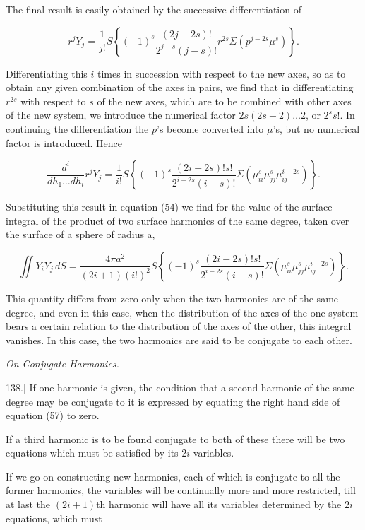 \documentclass[11pt,a4paper]{article}
\begin{document}
The final result is easily obtained by the successive differentiation of

\[
r^jY_j=\frac{1}{j!}S\left\{(-1)^s\frac{(2j-2s)!}{2^{j-s}(j-s)!}r^{2s}\Sigma(p^{j-2s}\mu^s)\right\}.
\]

Differentiating this $i$ times in succession with respect to the new axes, so as to obtain any given combination of the axes in pairs, we find that in differentiating $r^{2s}$ with respect to $s$ of the new axes, which are to be combined with other axes of the new system, we introduce the numerical factor $2s(2s-2)\ldots2$, or $2^s s!$. In continuing the differentiation the $p$'s become converted into $\mu$'s, but no numerical factor is introduced. Hence

\begin{equation}\tag{56}
\frac{d^i}{dh_1\ldots dh_i}r^jY_j
=\frac{1}{i!}S\left\{(-1)^s\frac{(2i-2s)!s!}{2^{i-2s}(i-s)!}
\Sigma(\mu_{ii}^s\mu_{jj}^s\mu_{ij}^{i-2s})\right\}.
\end{equation}

Substituting this result in equation (54) we find for the value of the surface-integral of the product of two surface harmonics of the same degree, taken over the surface of a sphere of radius a,

\begin{equation}\tag{57}
\iint Y_iY_j\,dS=\frac{4\pi a^2}{(2i+1)(i!)^2}
S\left\{(-1)^s\frac{(2i-2s)!s!}{2^{i-2s}(i-s)!}
\Sigma(\mu_{ii}^s\mu_{jj}^s\mu_{ij}^{i-2s})\right\}.
\end{equation}

This quantity differs from zero only when the two harmonics are of the same degree, and even in this case, when the distribution of the axes of the one system bears a certain relation to the distribution of the axes of the other, this integral vanishes. In this case, the two harmonics are said to be conjugate to each other.

{\centering\itshape On Conjugate Harmonics.\par}

138.] If one harmonic is given, the condition that a second harmonic of the same degree may be conjugate to it is expressed by equating the right hand side of equation (57) to zero.

If a third harmonic is to be found conjugate to both of these there will be two equations which must be satisfied by its $2i$ variables.

If we go on constructing new harmonics, each of which is conjugate to all the former harmonics, the variables will be continually more and more restricted, till at last the $(2i+1)$th harmonic will have all its variables determined by the $2i$ equations, which must
\end{document}
